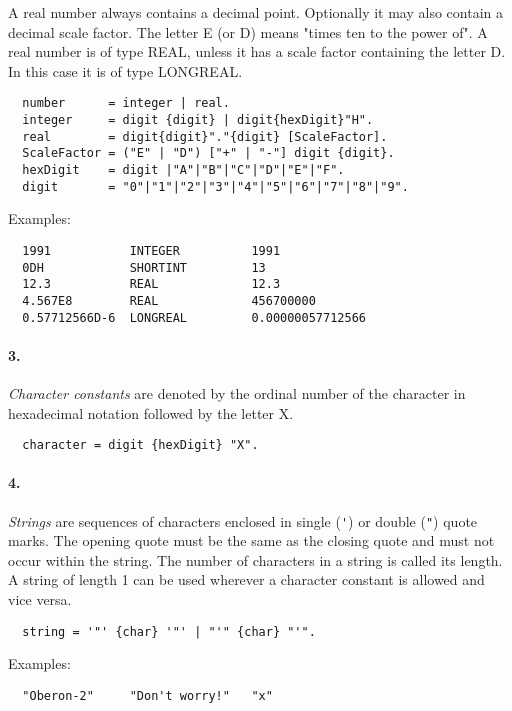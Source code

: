 A real number always contains
a decimal point. Optionally it may also contain a decimal scale factor.
The letter E (or D) means "times ten to the power of". A real number
is of type REAL, unless it has a scale factor containing the letter
D. In this case it is of type LONGREAL.
{\BNFsize
\begin{verbatim}
  number      = integer | real.
  integer     = digit {digit} | digit{hexDigit}"H".
  real        = digit{digit}"."{digit} [ScaleFactor].
  ScaleFactor = ("E" | "D") ["+" | "-"] digit {digit}.
  hexDigit    = digit |"A"|"B"|"C"|"D"|"E"|"F".
  digit       = "0"|"1"|"2"|"3"|"4"|"5"|"6"|"7"|"8"|"9".
\end{verbatim}}

\noindent
Examples:
\begin{verbatim}
  1991           INTEGER          1991
  0DH            SHORTINT         13
  12.3           REAL             12.3
  4.567E8        REAL             456700000
  0.57712566D-6  LONGREAL         0.00000057712566
\end{verbatim}

\paragraph{\rm 3.} {\em Character constants} are denoted by the ordinal
number of the character in hexadecimal notation followed by the letter
X.
{\BNFsize
\begin{verbatim}
  character = digit {hexDigit} "X".
\end{verbatim}}

\paragraph{\rm 4.} {\em Strings} are sequences of characters enclosed
in single (\verb|'|) or double (\verb|"|) quote marks.
The opening quote must be
the same as the closing quote and must not occur within the string.
The number of characters in a string is called its length. A string
of length 1 can be used wherever a character constant is allowed and
vice versa.
{\BNFsize
\begin{verbatim}
  string = '"' {char} '"' | "'" {char} "'".
\end{verbatim}}

\noindent
Examples:
\begin{verbatim}
  "Oberon-2"     "Don't worry!"   "x"
\end{verbatim}

